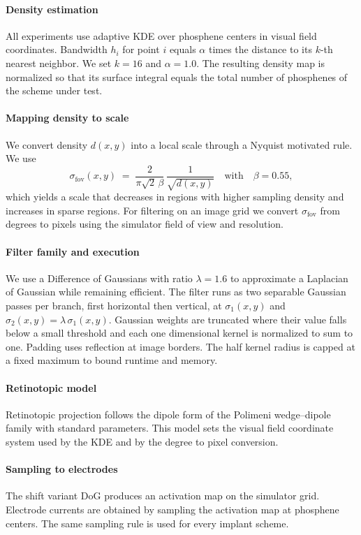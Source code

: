 \paragraph{Density estimation}
All experiments use adaptive KDE over phosphene centers in visual field coordinates. Bandwidth \(h_i\) for point \(i\) equals \(\alpha\) times the distance to its \(k\)-th nearest neighbor. We set \(k=16\) and \(\alpha=1.0\). The resulting density map is normalized so that its surface integral equals the total number of phosphenes of the scheme under test.

\paragraph{Mapping density to scale}
We convert density \(d(x,y)\) into a local scale through a Nyquist motivated rule. We use
\[
\sigma_{\text{fov}}(x,y) \;=\; \frac{2}{\pi \sqrt{2}\,\beta}\,\frac{1}{\sqrt{d(x,y)}} \quad\text{with}\quad \beta=0.55,
\]
which yields a scale that decreases in regions with higher sampling density and increases in sparse regions. For filtering on an image grid we convert \(\sigma_{\text{fov}}\) from degrees to pixels using the simulator field of view and resolution.

\paragraph{Filter family and execution}
We use a Difference of Gaussians with ratio \(\lambda=1.6\) to approximate a Laplacian of Gaussian while remaining efficient. The filter runs as two separable Gaussian passes per branch, first horizontal then vertical, at \(\sigma_1(x,y)\) and \(\sigma_2(x,y)=\lambda\,\sigma_1(x,y)\). Gaussian weights are truncated where their value falls below a small threshold and each one dimensional kernel is normalized to sum to one. Padding uses reflection at image borders. The half kernel radius is capped at a fixed maximum to bound runtime and memory.

\paragraph{Retinotopic model}
Retinotopic projection follows the dipole form of the Polimeni wedge–dipole family with standard parameters. This model sets the visual field coordinate system used by the KDE and by the degree to pixel conversion.

\paragraph{Sampling to electrodes}
The shift variant DoG produces an activation map on the simulator grid. Electrode currents are obtained by sampling the activation map at phosphene centers. The same sampling rule is used for every implant scheme.

